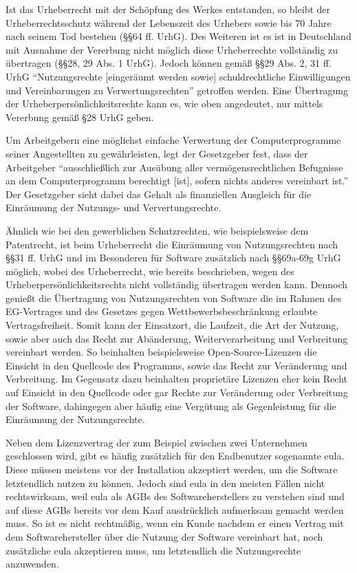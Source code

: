 Ist das Urheberrecht mit der Schöpfung des Werkes entstanden, so bleibt der Urheberrechtsschutz während der Lebenszeit des Urhebers sowie bis 70 Jahre nach seinem Tod bestehen (§§64 ff. UrhG).
Des Weiteren ist es ist in Deutschland mit Ausnahme der Vererbung nicht möglich diese Urheberrechte vollständig zu übertragen (§§28, 29 Abs. 1 UrhG). Jedoch können gemäß §§29 Abs. 2, 31 ff. UrhG
“Nutzungsrechte [eingeräumt werden sowie] schuldrechtliche Einwilligungen und Vereinbarungen zu Verwertungsrechten” getroffen werden. Eine Übertragung der Urheberpersönlichkeitsrechte
kann es, wie oben angedeutet, nur mittels Vererbung gemäß §28 UrhG geben.

Um Arbeitgebern eine möglichst einfache Verwertung der Computerprogramme seiner Angestellten zu gewährleisten, legt der Gesetzgeber fest, dass der Arbeitgeber
“ausschließlich zur Ausübung aller vermögensrechtlichen Befugnisse an dem Computerprogramm berechtigt [ist], sofern nichts anderes vereinbart ist.” Der Gesetzgeber
sieht dabei das Gehalt als finanziellen Ausgleich für die Einräumung der Nutzungs- und Ververtungsrechte. 

Ähnlich wie bei den gewerblichen Schutzrechten, wie beispielsweise dem Patentrecht, ist beim Urheberrecht die Einräumung von Nutzungsrechten nach §§31 ff. UrhG und im Besonderen
für Software zusätzlich nach §§69a-69g UrhG möglich, wobei des Urheberrecht, wie bereits beschrieben, wegen des Urheberpersönlichkeitsrechts nicht vollständig übertragen werden kann.
Dennoch genießt die Übertragung von Nutzungsrechten von Software die im Rahmen des EG-Vertrages und des Gesetzes gegen Wettbewerbsbeschränkung erlaubte Vertragsfreiheit. Somit kann der Einsatzort, die Laufzeit,
die Art der Nutzung, sowie aber auch das Recht zur Abänderung, Weiterverarbeitung und Verbreitung vereinbart werden. So beinhalten beispielsweise Open-Source-Lizenzen die
Einsicht in den Quellcode des Programms, sowie das Recht zur Veränderung und Verbreitung. Im Gegensatz dazu beinhalten proprietäre Lizenzen eher kein Recht auf Einsicht in den
Quellcode oder gar Rechte zur Veränderung oder Verbreitung der Software, dahingegen aber häufig eine Vergütung als Gegenleistung für die Einräumung der Nutzungsrechte.

Neben dem Lizenzvertrag der zum Beispiel zwischen zwei Unternehmen geschlossen wird, gibt es häufig zusätzlich für den Endbenutzer sogenannte \gls{eula}.
Diese müssen meistens vor der Installation akzeptiert werden, um die Software letztendlich nutzen zu können.
Jedoch sind \gls{eula} in den meisten Fällen nicht rechtswirksam, weil \gls{eula} als AGBs des Softwareherstellers zu verstehen sind und auf diese AGBs bereits vor dem
Kauf ausdrücklich aufmerksam gemacht werden muss. So ist es nicht rechtmäßig, wenn ein Kunde nachdem er einen Vertrag mit dem Softwarehersteller über die Nutzung der Software vereinbart hat,
noch zusätzliche \gls{eula} akzeptieren muss, um letztendlich die Nutzungsrechte anzuwenden. 
